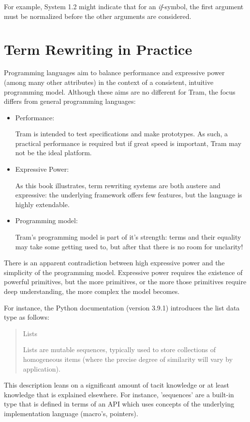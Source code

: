 \documentclass[11pt,twoside]{memoir}
\def\I{\textit} %
\begin{document}
For example, System 1.2 might indicate that for an \I{if}-symbol, the first argument must be normalized before the other arguments are considered.

\chapter{Term Rewriting in Practice}

Programming languages aim to balance performance and expressive power (among many other attributes) in the context of a consistent, intuitive programming model. Although these aims are no different for Tram, the focus differs from general programming languages:
\begin{itemize}
	\item Performance:
	
	Tram is intended to test specifications and make prototypes. As such, a practical performance is required but if great speed is important, Tram may not be the ideal platform. 
	
	\item Expressive Power:
	
	As this book illustrates, term rewriting systems are both austere and expressive: the underlying framework offers few features, but the language is highly extendable. 	
	
	\item Programming model:
	
	Tram's programming model is part of it's strength: terms and their equality may take some getting used to, but after that there is no room for unclarity!
\end{itemize}

There is an apparent contradiction between high expressive power and the simplicity of the programming model. Expressive power requires the existence of powerful primitives, but the more primitives, or the more those primitives require deep understanding, the more complex the model becomes.

For instance, the Python documentation (version 3.9.1) introduces the list data type as follows:
\begin{quote}
	Lists
	
	Lists are mutable sequences, typically used to store collections of homogeneous items (where the precise degree of similarity will vary by application).
\end{quote}

This description leans on a significant amount of tacit knowledge or at least knowledge that is  explained elsewhere. For instance, 'sequences' are a built-in type that is defined in terms of an API which uses concepts of the underlying implementation language (macro's, pointers).
\end{document}
